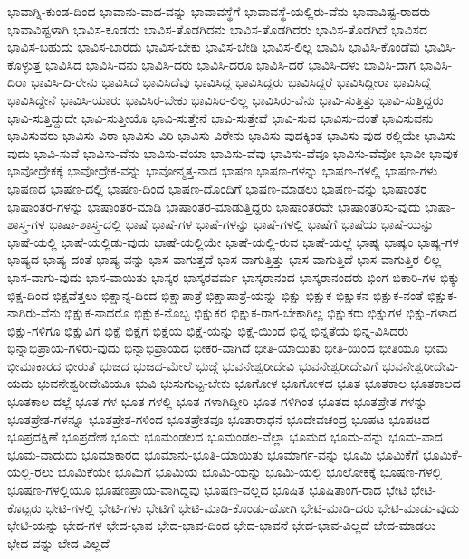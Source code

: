{ಭಾವಾಗ್ನಿ-ಕುಂಡ-ದಿಂದ
ಭಾವಾನು-ವಾದ-ವನ್ನು
ಭಾವಾವಸ್ಥೆಗೆ
ಭಾವಾವಸ್ಥೆ-ಯಲ್ಲಿರು-ವೆನು
ಭಾವಾವಿಷ್ಟ-ರಾದರು
ಭಾವಾವಿಷ್ಟಳಾಗಿ
ಭಾವಿಸ-ಕೂಡದು
ಭಾವಿಸ-ತೊಡಗಿದನು
ಭಾವಿಸ-ತೊಡಗಿದರು
ಭಾವಿಸ-ತೊಡಗಿದೆ
ಭಾವಿಸದ
ಭಾವಿಸ-ಬಹುದು
ಭಾವಿಸ-ಬಾರದು
ಭಾವಿಸ-ಬೇಕು
ಭಾವಿಸ-ಬೇಡಿ
ಭಾವಿಸ-ಲಿಲ್ಲ
ಭಾವಿಸಿ
ಭಾವಿಸಿ-ಕೊಂಡೆವು
ಭಾವಿಸಿ-ಕೊಳ್ಳುತ್ತ
ಭಾವಿಸಿದ
ಭಾವಿಸಿ-ದನು
ಭಾವಿಸಿ-ದರು
ಭಾವಿಸಿ-ದರೂ
ಭಾವಿಸಿ-ದರೆ
ಭಾವಿಸಿ-ದಳು
ಭಾವಿಸಿ-ದಾಗ
ಭಾವಿಸಿ-ದಿರಾ
ಭಾವಿಸಿ-ದಿ-ರೇನು
ಭಾವಿಸಿದೆ
ಭಾವಿಸಿದೆವು
ಭಾವಿಸಿದ್ದ
ಭಾವಿಸಿದ್ದರು
ಭಾವಿಸಿದ್ದರೆ
ಭಾವಿಸಿದ್ದೀರಾ
ಭಾವಿಸಿದ್ದೆ
ಭಾವಿಸಿದ್ದೇನೆ
ಭಾವಿಸಿ-ಯಾರು
ಭಾವಿಸಿರ-ಬೇಕು
ಭಾವಿಸಿರ-ಲಿಲ್ಲ
ಭಾವಿಸಿರು-ವೆನು
ಭಾವಿ-ಸುತ್ತಿತ್ತು
ಭಾವಿ-ಸುತ್ತಿದ್ದರು
ಭಾವಿ-ಸುತ್ತಿದ್ದುದೇ
ಭಾವಿ-ಸುತ್ತೀಯೊ
ಭಾವಿ-ಸುತ್ತೇನೆ
ಭಾವಿ-ಸುತ್ತೇವೆ
ಭಾವಿ-ಸುವ
ಭಾವಿಸು-ವಂತೆ
ಭಾವಿಸುವನು
ಭಾವಿಸುವರು
ಭಾವಿಸು-ವಿರಾ
ಭಾವಿಸು-ವಿರಿ
ಭಾವಿಸು-ವಿರೇನು
ಭಾವಿಸು-ವುದಕ್ಕಿಂತ
ಭಾವಿಸು-ವುದ-ರಲ್ಲಿಯೇ
ಭಾವಿಸು-ವುದು
ಭಾವಿ-ಸುವೆ
ಭಾವಿಸು-ವೆನು
ಭಾವಿಸು-ವೆಯಾ
ಭಾವಿಸು-ವೆವು
ಭಾವಿಸು-ವೆವೂ
ಭಾವಿಸು-ವೆವೋ
ಭಾವೀ
ಭಾವುಕ
ಭಾವೋದ್ರೇಕಕ್ಕೆ
ಭಾವೋದ್ರೇಕ-ವನ್ನು
ಭಾವೋನ್ಮತ್ತ-ನಾದ
ಭಾಷಣ
ಭಾಷಣ-ಗಳನ್ನು
ಭಾಷಣ-ಗಳಲ್ಲಿ
ಭಾಷಣ-ಗಳು
ಭಾಷಣದ
ಭಾಷಣ-ದಲ್ಲಿ
ಭಾಷಣ-ದಿಂದ
ಭಾಷಣ-ದೊಂದಿಗೆ
ಭಾಷಣ-ಮಾಡಲು
ಭಾಷಣ-ವನ್ನು
ಭಾಷಾಂತರ
ಭಾಷಾಂತರ-ಗಳನ್ನು
ಭಾಷಾಂತರ-ಮಾಡಿ
ಭಾಷಾಂತರ-ಮಾಡುತ್ತಿದ್ದರು
ಭಾಷಾಂತರವೇ
ಭಾಷಾಂತರಿಸು-ವುದು
ಭಾಷಾ-ಶಾಸ್ತ್ರ-ಗಳ
ಭಾಷಾ-ಶಾಸ್ತ್ರ-ದಲ್ಲಿ
ಭಾಷೆ
ಭಾಷೆ-ಗಳ
ಭಾಷೆ-ಗಳನ್ನು
ಭಾಷೆ-ಗಳಲ್ಲಿ
ಭಾಷೆಗೆ
ಭಾಷೆಯ
ಭಾಷೆ-ಯನ್ನು
ಭಾಷೆ-ಯಲ್ಲಿ
ಭಾಷೆ-ಯಲ್ಲಿಡು-ವುದು
ಭಾಷೆ-ಯಲ್ಲಿಯೇ
ಭಾಷೆ-ಯಲ್ಲಿ-ರುವ
ಭಾಷೆ-ಯಲ್ಲೆ
ಭಾಷ್ಯ
ಭಾಷ್ಯಂ
ಭಾಷ್ಯ-ಗಳ
ಭಾಷ್ಯದ
ಭಾಷ್ಯ-ದಂತೆ
ಭಾಷ್ಯ-ವನ್ನು
ಭಾಸ-ವಾಗುತ್ತದೆ
ಭಾಸ-ವಾಗುತ್ತಿತ್ತು
ಭಾಸ-ವಾಗುತ್ತಿದೆ
ಭಾಸ-ವಾಗುತ್ತಿರ-ಲಿಲ್ಲ
ಭಾಸ-ವಾಗು-ವುದು
ಭಾಸ-ವಾಯಿತು
ಭಾಸ್ಕರ
ಭಾಸ್ಕರವರ್ಮ
ಭಾಸ್ಕರಾನಂದ
ಭಾಸ್ಕರಾನಂದರು
ಭಿಂಗ
ಭಿಕಾರಿ-ಗಳ
ಭಿಕ್ಕು
ಭಿಕ್ಷ-ದಿಂದ
ಭಿಕ್ಷವೆತ್ತಲು
ಭಿಕ್ಷಾನ್ನ-ದಿಂದ
ಭಿಕ್ಷಾಪಾತ್ರೆ
ಭಿಕ್ಷಾಪಾತ್ರೆ-ಯನ್ನು
ಭಿಕ್ಷು
ಭಿಕ್ಷುಕ
ಭಿಕ್ಷುಕನ
ಭಿಕ್ಷುಕ-ನಂತೆ
ಭಿಕ್ಷುಕ-ನಾಗಿರು-ವೆನು
ಭಿಕ್ಷುಕ-ನಾದರೊ
ಭಿಕ್ಷುಕ-ನೊಬ್ಬ
ಭಿಕ್ಷುಕರ
ಭಿಕ್ಷುಕ-ರಾಗ-ಬೇಕಾಗಿಲ್ಲ
ಭಿಕ್ಷುಕರು
ಭಿಕ್ಷುಗಳ
ಭಿಕ್ಷು-ಗಳಾದ
ಭಿಕ್ಷು-ಗಳಿಗೂ
ಭಿಕ್ಷುವಿಗೆ
ಭಿಕ್ಷೆ
ಭಿಕ್ಷೆಗೆ
ಭಿಕ್ಷೆಯ
ಭಿಕ್ಷೆ-ಯನ್ನು
ಭಿಕ್ಷೆ-ಯಿಂದ
ಭಿನ್ನ
ಭಿನ್ನತೆಯ
ಭಿನ್ನ-ವಿಸಿದರು
ಭಿನ್ನಾಭಿಪ್ರಾಯ-ಗಳಿರು-ವುದು
ಭಿನ್ನಾಭಿಪ್ರಾಯದ
ಭೀಕರ-ವಾಗಿದೆ
ಭೀತಿ-ಯಾಯಿತು
ಭೀತಿ-ಯಿಂದ
ಭೀತಿಯೂ
ಭೀಮ
ಭೀಮಾಕಾರದ
ಭೀರುತೆ
ಭುಜದ
ಭುಜದ-ಮೇಲೆ
ಭುಜ್ಗೆ
ಭುವನೇಶ್ವರೀದೇವಿ
ಭುವನೇಶ್ವರೀದೇವಿಗೆ
ಭುವನೇಶ್ವರೀದೇವಿ-ಯದು
ಭುವನೇಶ್ವರೀದೇವಿಯೂ
ಭುವಿ
ಭುಸುಗುಟ್ಟ-ಬೇಕು
ಭೂಗೋಳ
ಭೂಗೋಳದ
ಭೂತ
ಭೂತಕಾಲ
ಭೂತಕಾಲದ
ಭೂತಕಾಲ-ದಲ್ಲೆ
ಭೂತ-ಗಳ
ಭೂತ-ಗಳಲ್ಲಿ
ಭೂತ-ಗಳಾಗಿದ್ದೀರಿ
ಭೂತ-ಗಳಿಗಿಂತ
ಭೂತದ
ಭೂತಪ್ರೇತ-ಗಳನ್ನು
ಭೂತಪ್ರೇತ-ಗಳನ್ನೂ
ಭೂತಪ್ರೇತ-ಗಳಿಂದ
ಭೂತಪ್ರೇತವೂ
ಭೂತಾರಾಧನೆ
ಭೂದೇವಚಂದ್ರ
ಭೂಪಟ
ಭೂಪಟದ
ಭೂಪ್ರದಕ್ಷಿಣೆ
ಭೂಪ್ರದೇಶ
ಭೂಮ
ಭೂಮಂಡಲದ
ಭೂಮಂಡಲ-ವೆಲ್ಲಾ
ಭೂಮದ
ಭೂಮ-ವನ್ನು
ಭೂಮ-ವಾದ
ಭೂಮ-ವಾದುದು
ಭೂಮಾಕಾರದ
ಭೂಮಾನು-ಭೂತಿ-ಯಾಯಿತು
ಭೂಮಾರ್ಗ-ವನ್ನು
ಭೂಮಿ
ಭೂಮಿಕೆಗೆ
ಭೂಮಿಕೆ-ಯಲ್ಲಿ-ರಲು
ಭೂಮಿಕೆಯೇ
ಭೂಮಿಗೆ
ಭೂಮಿಯ
ಭೂಮಿ-ಯನ್ನು
ಭೂಮಿ-ಯಲ್ಲಿ
ಭೂಲೋಕಕ್ಕೆ
ಭೂಷಣ-ಗಳಲ್ಲಿ
ಭೂಷಣ-ಗಳಲ್ಲಿಯೂ
ಭೂಷಣಪ್ರಾಯ-ವಾಗಿದ್ದವು
ಭೂಷಣ-ವಲ್ಲದ
ಭೂಷಿತ
ಭೂಷಿತಾಂಗ-ರಾದ
ಭೇಟಿ
ಭೇಟಿ-ಕೊಟ್ಟರು
ಭೇಟಿ-ಗಳಲ್ಲಿ
ಭೇಟಿ-ಗಳು
ಭೇಟಿಗೆ
ಭೇಟಿ-ಮಾಡಿ-ಕೊಂಡು-ಹೋಗಿ
ಭೇಟಿ-ಮಾಡಿ-ದರು
ಭೇಟಿ-ಮಾಡು-ವುದು
ಭೇಟಿ-ಯನ್ನು
ಭೇದ-ಗಳ
ಭೇದ-ಭಾವ
ಭೇದ-ಭಾವ-ದಿಂದ
ಭೇದ-ಭಾವನೆ
ಭೇದ-ಭಾವ-ವಿಲ್ಲದೆ
ಭೇದ-ಮಾಡಲು
ಭೇದ-ವನ್ನು
ಭೇದ-ವಿಲ್ಲದೆ
}

